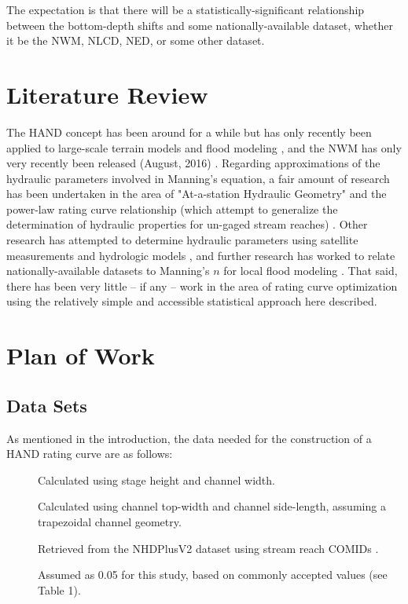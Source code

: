 \documentclass[11pt]{article}
\begin{document}
The expectation is that there will be a statistically-significant relationship between the bottom-depth shifts and some nationally-available dataset, whether it be the NWM, NLCD, NED, or some other dataset.  

\section*{Literature Review} %

The HAND concept has been around for a while but has only recently been applied to large-scale terrain models \cite{handpaper} and flood modeling \cite{nfiehand}, and the NWM has only very recently been released (August, 2016) \cite{nwmsummary}. Regarding approximations of the hydraulic parameters involved in Manning's equation, a fair amount of research has been undertaken in the area of "At-a-station Hydraulic Geometry" and the power-law rating curve relationship (which attempt to generalize the determination of hydraulic properties for un-gaged stream reaches) \cite{ahgdingman, ahgchen}. Other research has attempted to determine hydraulic parameters using satellite measurements and hydrologic models \cite{sathydroparams}, and further research has worked to relate nationally-available datasets to Manning's $n$ for local flood modeling \cite{ahgmoore}. That said, there has been very little -- if any -- work in the area of rating curve optimization using the relatively simple and accessible statistical approach here described. 

\section*{Plan of Work} %

  \subsection*{Data Sets} %

  As mentioned in the introduction, the data needed for the construction of a HAND rating curve are as follows: 

  \begin{description}
    \item[] Calculated using stage height and channel width.
    \item[] Calculated using channel top-width and channel side-length, assuming a trapezoidal channel geometry. 
    \item[] Retrieved from the NHDPlusV2 dataset using stream reach COMIDs \cite{nhdplusv2}.
    \item[] Assumed as 0.05 for this study, based on commonly accepted values (see Table 1).
  \end{description}
\end{document}
